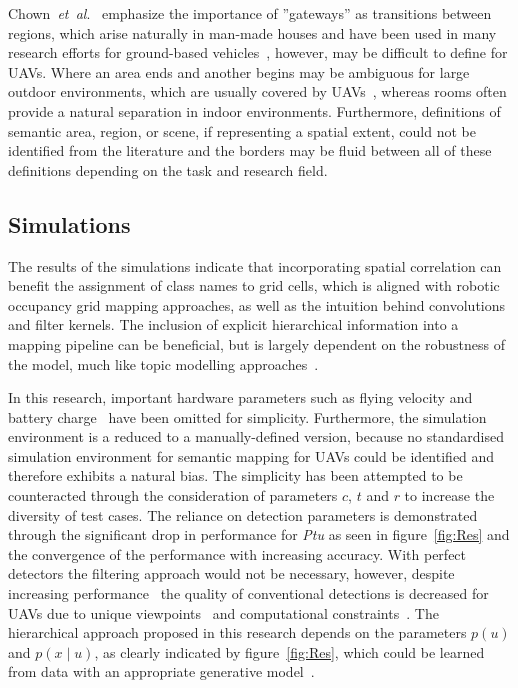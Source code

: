 \documentclass[twocolumn,letterpaper]{IEEEAerospaceCLS}  %
\newcommand{\abbreviation}[1]{\emph{#1}.}
\newcommand{\etal}{\abbreviation{et~al}}
\begin{document}
Chown~\etal~\cite{chown_prototypes_1995} emphasize the importance of ''gateways'' as transitions between regions, which arise naturally in man-made houses and have been used in many research efforts for ground-based vehicles~\cite{kuipers_local_2004,wu_learning_2018,krishnan_visual_2010}, however, may be difficult to define for UAVs. Where an area ends and another begins may be ambiguous for large outdoor environments, which are usually covered by UAVs~\cite{vanegas_novel_2018,shetty_implementation_2020}, whereas rooms often provide a natural separation in indoor environments. Furthermore, definitions of semantic area, region, or scene, if representing a spatial extent, could not be identified from the literature and the borders may be fluid between all of these definitions depending on the task and research field.

\subsection{Simulations} \label{ssec:ConclSim}
The results of the simulations indicate that incorporating spatial correlation can benefit the assignment of class names to grid cells, which is aligned with robotic occupancy grid mapping approaches, as well as the intuition behind convolutions and filter kernels. The inclusion of explicit hierarchical information into a mapping pipeline can be beneficial, but is largely dependent on the robustness of the model, much like topic modelling approaches~\cite{fei-fei_bayesian_2005,blei_latent_2003}.

In this research, important hardware parameters such as flying velocity and battery charge~\cite{boroujerdian_mavbench_2018} have been omitted for simplicity. Furthermore, the simulation environment is a reduced to a manually-defined version, because no standardised simulation environment for semantic mapping for UAVs could be identified and therefore exhibits a natural bias. The simplicity has been attempted to be counteracted through the consideration of parameters $c$, $t$ and $r$ to increase the diversity of test cases.   
The reliance on detection parameters is demonstrated through the significant drop in performance for \emph{Ptu} as seen in figure~\ref{fig:Res} and the convergence of the performance with increasing accuracy. With perfect detectors the filtering approach would not be necessary, however, despite increasing performance~\cite{alom_history_2018} the quality of conventional detections is decreased for UAVs due to unique viewpoints~\cite{richardwebster_psyphy:_2019} and computational constraints~\cite{krishnan_sky_2020}. The hierarchical approach proposed in this research depends on the parameters $p(u)$ and $p(x\mid u)$, as clearly indicated by figure~\ref{fig:Res}, which could be learned from data with an appropriate generative model~\cite{blei_latent_2003,lienou_semantic_2010}.
\end{document}
